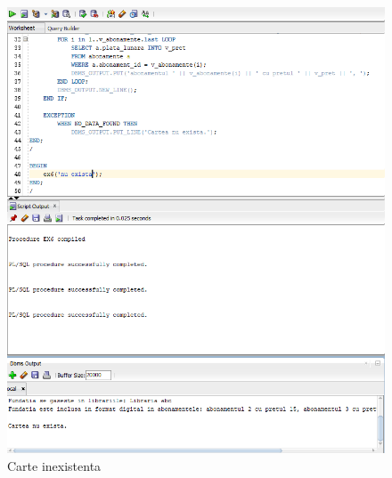 \documentclass[12pt]{article}
\begin{document}
\begin{figure}[!htb]
\includegraphics[max width=\linewidth]{imgs/ex6_3.png}
\caption{Carte inexistenta}
\label{fig:ex6_3}
\end{figure}
\end{document}
